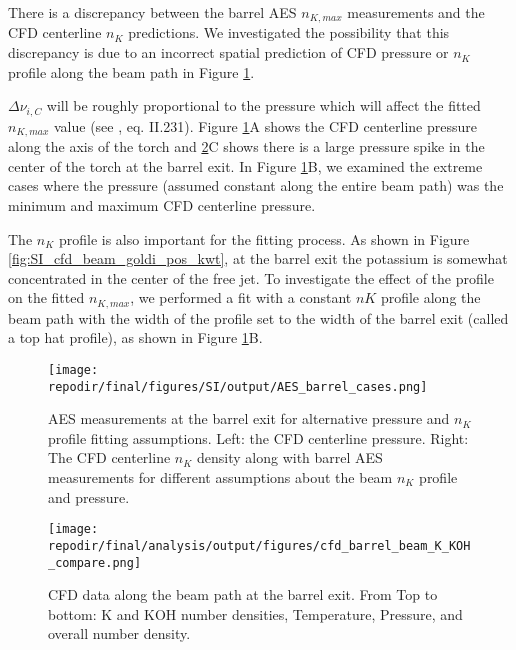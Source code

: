 There is a discrepancy between the barrel AES $n_{K,max}$ measurements and the CFD centerline $n_{K}$ predictions. We investigated the possibility that this discrepancy is due to an incorrect spatial prediction of CFD pressure or $n_{K}$ profile along the beam path in Figure \ref{fig:SI_AES_barrel_cases}.  

$\Delta \nu_{i,C}$ will be roughly proportional to the pressure which will affect the fitted $n_{K,max}$ value (see \cite{alkemadeMetalVapoursFlames1982}, eq. II.231). Figure \ref{fig:SI_AES_barrel_cases}A shows the CFD centerline pressure along the axis of the torch and \ref{fig:SI_cfd_barrel_beam_K_KOH_compare}C shows there is a large pressure spike in the center of the torch at the barrel exit. In Figure \ref{fig:SI_AES_barrel_cases}B, we examined the extreme cases where the pressure (assumed constant along the entire beam path) was the minimum and maximum CFD centerline pressure. 

The $n_{K}$ profile is also important for the fitting process. As shown in Figure \ref{fig:SI_cfd_beam_goldi_pos_kwt}, at the barrel exit the potassium is somewhat concentrated in the center of the free jet. To investigate the effect of the profile on the fitted $n_{K,max}$, we performed a fit with a constant $n{K}$ profile along the beam path with the width of the profile set to the width of the barrel exit (called a top hat profile), as shown in Figure \ref{fig:SI_AES_barrel_cases}B.


\begin{figure}[]
    \centering
    \texttt{[image: \\repodir/final/figures/SI/output/AES\_barrel\_cases.png]}
    \caption{AES measurements at the barrel exit for alternative pressure and $n_{K}$ profile fitting assumptions. Left: the CFD centerline pressure. Right: The CFD centerline $n_{K}$ density along with barrel AES measurements for different assumptions about the beam $n_{K}$ profile and pressure. }
    \label{fig:SI_AES_barrel_cases}
\end{figure}


\begin{figure}[]
    \centering
    \texttt{[image: \\repodir/final/analysis/output/figures/cfd\_barrel\_beam\_K\_KOH\_compare.png]}
    \caption{CFD data along the beam path at the barrel exit. From Top to bottom: K and KOH number densities, Temperature, Pressure, and overall number density. }
    \label{fig:SI_cfd_barrel_beam_K_KOH_compare}
\end{figure}



